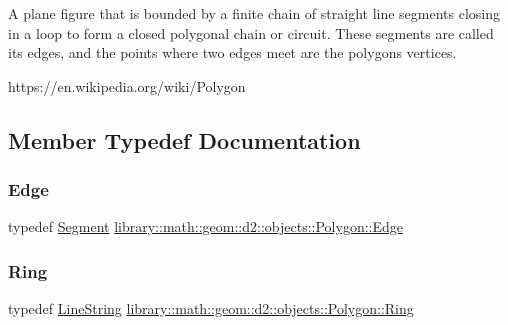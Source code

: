 A plane figure that is bounded by a finite chain of straight line segments closing in a loop to form a closed polygonal chain or circuit. These segments are called its edges, and the points where two edges meet are the polygon\textquotesingle{}s vertices.

https\+://en.wikipedia.\+org/wiki/\+Polygon 

\subsection{Member Typedef Documentation}
\mbox{\label{classlibrary_1_1math_1_1geom_1_1d2_1_1objects_1_1_polygon_a17e3083d71685e16f3244298e6f44ad9}} 
\subsubsection{\texorpdfstring{Edge}{Edge}}
{\footnotesize\ttfamily typedef \hyperlink{classlibrary_1_1math_1_1geom_1_1d2_1_1objects_1_1_segment}{Segment} \hyperlink{classlibrary_1_1math_1_1geom_1_1d2_1_1objects_1_1_polygon_a17e3083d71685e16f3244298e6f44ad9}{library\+::math\+::geom\+::d2\+::objects\+::\+Polygon\+::\+Edge}}

\mbox{\label{classlibrary_1_1math_1_1geom_1_1d2_1_1objects_1_1_polygon_aa543e7078b73e1d307ca8317d765cd9c}} 
\subsubsection{\texorpdfstring{Ring}{Ring}}
{\footnotesize\ttfamily typedef \hyperlink{classlibrary_1_1math_1_1geom_1_1d2_1_1objects_1_1_line_string}{Line\+String} \hyperlink{classlibrary_1_1math_1_1geom_1_1d2_1_1objects_1_1_polygon_aa543e7078b73e1d307ca8317d765cd9c}{library\+::math\+::geom\+::d2\+::objects\+::\+Polygon\+::\+Ring}}

\mbox{\label{classlibrary_1_1math_1_1geom_1_1d2_1_1objects_1_1_polygon_a1559cddbcb23d41f2be9e389b0ccd127}} 
